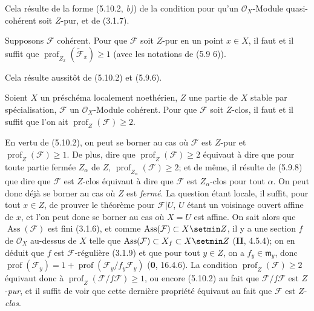 
Cela résulte de la forme (5.10.2, \emph{b)}) de la condition pour qu'un
$\mathcal O_X$-Module quasi-cohérent soit $Z$-pur, et de (3.1.7).

\begin{corollary}[5.10.4]
\label{IV.2.s5.10.4-fr}
Supposons $\mathcal F$ cohérent. Pour que $\mathcal F$ soit $Z$-pur en un
point $x\in X$, il faut et il suffit que
$\operatorname{prof}_{Z_x}(\widetilde{\mathcal F}_x)\geq1$
\textup{(}avec les notations de \textup{(5.9 6))}.
\end{corollary}

Cela résulte aussitôt de (5.10.2) et (5.9.6).

\begin{theorem}[5.10.5]
Soient $X$ un préschéma localement noethérien, $Z$ une partie de $X$ stable
par spécialisation, $\mathcal F$ un $\mathcal O_X$-Module cohérent. Pour que
$\mathcal F$ soit $Z$-clos, il faut et il suffit que l'on ait
$\operatorname{prof}_Z(\mathcal F)\geq2$.
\end{theorem}

En vertu de (5.10.2), on peut se borner au cas où $\mathcal F$ est $Z$-pur
et $\operatorname{prof}_Z(\mathcal F)\geq1$. De plus, dire que
$\operatorname{prof}_Z(\mathcal F)\geq2$ équivaut à dire que pour toute partie
fermée $Z_\alpha$ de $Z$, $\operatorname{prof}_{Z_\alpha}(\mathcal F)\geq2$;
et de même, il résulte de (5.9.8) que dire que $\mathcal F$ est $Z$-clos
équivaut à dire que $\mathcal F$ est $Z_\alpha$-clos pour tout $\alpha$. On
peut donc déjà se borner au cas où $Z$ est \emph{fermé}. La question étant locale,
il suffit, pour tout $x\in Z$, de prouver le théorème pour $\mathcal F|U$,
$U$ étant un voisinage ouvert affine de $x$, et l'on peut donc se borner au
cas où $X=U$ est affine. On sait alors que $\operatorname{Ass}(\mathcal F)$
est fini (3.1.6), et comme
$\operatorname{Ass}(\mathcal F)\subset X\setmin Z$, il y a une section $f$ de
$\mathcal O_X$ au-dessus de $X$ telle que
$\operatorname{Ass}(\mathcal F)\subset X_f\subset X\setmin Z$ (\textbf{II}, 4.5.4); on en
déduit que $f$ est $\mathcal F$-régulière (3.1.9) et que pour tout $y\in Z$,
on a $f_y\in\mathfrak m_y$, donc
$\operatorname{prof}(\mathcal F_y)
=1+\operatorname{prof}(\mathcal F_y/f_y\mathcal F_y)$
(\textbf{0}, 16.4.6).
La condition $\operatorname{prof}_Z(\mathcal F)\geq2$ équivaut donc à
$\operatorname{prof}_Z(\mathcal F/f\mathcal F)\geq1$, ou encore (5.10.2) au
fait que $\mathcal F/f\mathcal F$ est $Z$-\emph{pur}, et il suffit de voir que cette
dernière propriété équivaut au fait que $\mathcal F$ est $Z$-\emph{clos}.

